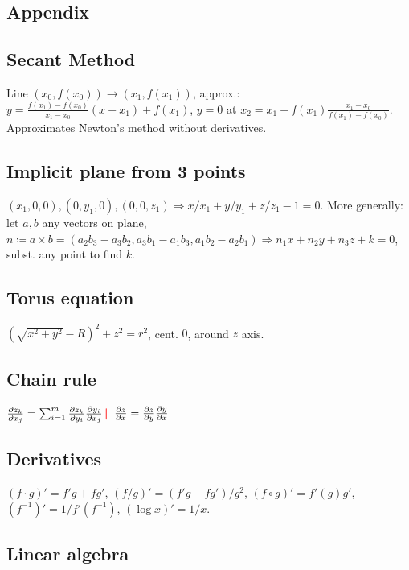 \documentclass[11pt,landscape,a4paper,fleqn]{article}
\newcommand{\sep}{\,\textcolor{red}{\bm|}\,}
\begin{document}
\begin{multicols*}{4}
\section{Appendix}

\subsection*{Secant Method}

Line $(x_0, f(x_0)) \to (x_1, f(x_1))$, approx.:
$y = \frac{f(x_1) - f(x_0)}{x_1 - x_0}(x - x_1) + f(x_1)$,
$y = 0$ at $x_2 = x_1 - f(x_1) \frac{x_1 - x_0}{f(x_1) - f(x_0)}$.
Approximates Newton's method without derivatives.

\subsection*{Implicit plane from 3 points}

$(x_1, 0, 0), (0, y_1, 0), (0, 0, z_1) \Rightarrow x / x_1 + y / y_1 + z / z_1 - 1 = 0$.
More generally: let $a, b$ any vectors on plane,
$n \coloneqq a \times b = (a_2 b_3 - a_3 b_2, a_3b_1 - a_1b_3, a_1b_2 - a_2b_1) \Rightarrow n_1 x + n_2 y + n_3 z + k = 0$,
subst. any point to find $k$.

\subsection*{Torus equation}

\!\!\!\!$(\sqrt{x^2 + y^2} - R)^2 + z^2 = r^2$, cent. $0$, around $z$ axis.

\subsection*{Chain rule}
$\pdv{z_k}{x_j} = \sum_{i=1}^{m} \pdv{z_k}{y_i} \pdv{y_i}{x_j} \sep$
$\pdv{z}{x} = \pdv{z}{y} \pdv{y}{x}$


\subsection*{Derivatives}

$(f \cdot g)' = f'g + fg'$,
$(f / g)' = (f'g - fg') / g^2$,
$(f \circ g)' = f'(g)g'$,
$(f^{-1})' = 1 / f'(f^{-1})$,
$(\log x)' = 1 / x$.

\subsection*{Linear algebra}


\end{multicols*}
\end{document}

